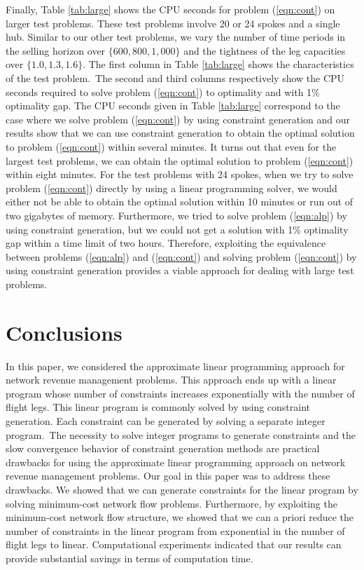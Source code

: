 Finally, Table \ref{tab:large} shows the CPU seconds for problem (\ref{eqn:cont}) on larger test problems. These test problems involve 20 or 24 spokes and a single hub. Similar to our other test problems, we vary the number of time periods in the selling horizon over $\{ 600,800,1\!,\!000\}$ and the tightness of the leg capacities over $\{1.0,1.3,1.6\}$. The first column in Table \ref{tab:large} shows the characteristics of the test problem.~The second and third columns respectively show the  CPU seconds required to solve problem (\ref{eqn:cont}) to optimality and with 1\% optimality gap. The CPU seconds given in Table \ref{tab:large} correspond to the case where we solve problem (\ref{eqn:cont}) by using constraint generation and our results show that we can use constraint generation to obtain the optimal solution to problem (\ref{eqn:cont}) within several minutes. It turns out that even for the largest test problems, we can obtain the optimal solution to problem (\ref{eqn:cont}) within eight minutes. For the test problems with 24 spokes, when we try to solve problem (\ref{eqn:cont}) directly by using a linear programming solver, we would either not be able to obtain the optimal solution within 10 minutes or run out of two gigabytes of memory. Furthermore, we tried to solve problem (\ref{eqn:alp}) by using constraint generation, but we could not get a solution with 1\% optimality gap within a time limit of two hours. Therefore, exploiting the equivalence between problems (\ref{eqn:alp}) and (\ref{eqn:cont}) and solving problem (\ref{eqn:cont}) by using constraint generation provides a viable approach for dealing with large test problems.


\section{Conclusions}
\label{sec:conc}

In this paper, we considered the approximate linear programming approach for network revenue management problems. This approach ends up with a linear program whose number of constraints increases exponentially with the number of flight legs. This linear program is commonly solved by using constraint generation. Each constraint can be generated by solving a separate integer program.~The necessity to solve integer programs to generate constraints and the slow convergence behavior of constraint generation methods are practical drawbacks for using the approximate linear programming approach on network revenue management problems. Our goal in this paper was to address these drawbacks. We showed that we can generate constraints for the linear program by solving minimum-cost network flow problems. Furthermore, by exploiting the minimum-cost network flow structure, we showed that we can a priori reduce the number of constraints in the linear program from exponential in the number of flight legs to linear. Computational experiments indicated that our results can provide substantial savings in terms of computation time. 


